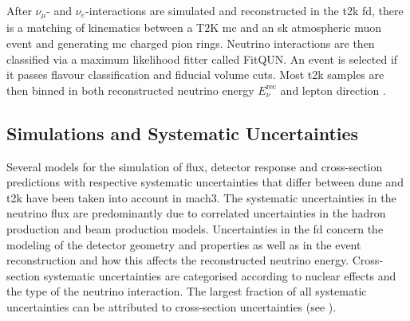 After $\nu_\mu$- and $\nu_e$-interactions are simulated and reconstructed in the \acrshort{t2k} \acrshort{fd}, there is a matching of kinematics between a T$2$K 
\acrshort{mc} and an \acrshort{sk} atmospheric muon event and generating \acrshort{mc} charged pion rings. Neutrino interactions are then classified via a maximum likelihood fitter called FitQUN. An event is selected if it passes flavour classification and fiducial volume cuts. Most \acrshort{t2k} samples are then binned in both reconstructed neutrino energy $E_\nu^\text{rec}$ and lepton direction \cite{t2k-tech-342_numu,t2k-tech-389_nue}.%

\subsection{Simulations and Systematic Uncertainties} \label{sec:sim_and_uncertainties}
%
%
Several models for the simulation of flux, detector response and cross-section predictions with respective systematic uncertainties that differ between \acrshort{dune} and \acrshort{t2k} have been taken into account in \acrshort{mach3}. The systematic uncertainties in the neutrino flux are predominantly due to correlated uncertainties in the hadron production and beam production models. Uncertainties in the \acrshort{fd} concern the modeling of the detector geometry and properties as well as in the event reconstruction and how this affects the reconstructed neutrino energy. Cross-section systematic uncertainties are categorised according to nuclear effects and the type of the neutrino interaction. The largest fraction of all systematic uncertainties can be attributed to cross-section uncertainties (see ).
%
